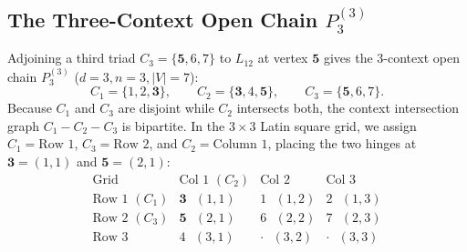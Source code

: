 \documentclass[aps,pra,reprint,superscriptaddress,longbibliography,nofootinbib,floatfix,10pt]{revtex4-2}
\theoremstyle{definition}\newtheorem{definition}[theorem]{Definition}
\theoremstyle{remark}\newtheorem{remark}[theorem]{Remark}
\begin{document}
\subsection{The Three-Context Open Chain \texorpdfstring{$P_3^{(3)}$}{P3(3)}}\label{sec:P3}

Adjoining a third triad $C_3=\{\mathbf{5},6,7\}$ to $L_{12}$ at vertex $\mathbf{5}$ gives the $3$-context open chain $P_3^{(3)}$ ($d=3,n=3,|V|=7$):
\begin{equation}\label{eq:P3}
C_1=\{1,2,\mathbf{3}\},\qquad C_2=\{\mathbf{3},4,\mathbf{5}\},\qquad C_3=\{\mathbf{5},6,7\}.
\end{equation}
Because $C_1$ and $C_3$ are disjoint while $C_2$ intersects both, the context intersection graph $C_1-C_2-C_3$ is bipartite. In the $3\times 3$ Latin square grid, we assign $C_1=\text{Row 1}$, $C_3=\text{Row 2}$, and $C_2=\text{Column 1}$, placing the two hinges at $\mathbf{3}=(1,1)$ and $\mathbf{5}=(2,1)$:
\begin{equation}\label{eq:P3-grid}
\begin{array}{c|ccc}
\text{Grid} & \text{Col 1 }(C_2) & \text{Col 2} & \text{Col 3}\\\hline
\text{Row 1 }(C_1) & \mathbf{3}\text{ }(1,1) & 1\text{ }(1,2) & 2\text{ }(1,3)\\
\text{Row 2 }(C_3) & \mathbf{5}\text{ }(2,1) & 6\text{ }(2,2) & 7\text{ }(2,3)\\
\text{Row 3} & 4\text{ }(3,1) & \cdot\text{ }(3,2) & \cdot\text{ }(3,3)
\end{array}
\end{equation}
\end{document}
